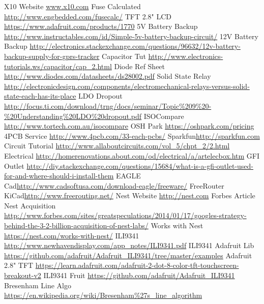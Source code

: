 \renewcommand{\refname}{}
\begin{thebibliography}{9}
 X10 Website \url{www.x10.com}
 Fuse Calculated \url{http://www.engbedded.com/fusecalc/}
 TFT 2.8" LCD \url{https://www.adafruit.com/products/1770}
 5V Battery Backup \url{http://www.instructables.com/id/Simple-5v-battery-backup-circuit/}
 12V Battery Backup \url{http://electronics.stackexchange.com/questions/96632/12v-battery-backup-supply-for-gprs-tracker}
 Capacitor Tut \url{http://www.electronics-tutorials.ws/capacitor/cap_2.html}
 Diode Ref Sheet \url{http://www.diodes.com/datasheets/ds28002.pdf}
 Solid State Relay \url{http://electronicdesign.com/components/electromechanical-relays-versus-solid-state-each-has-its-place}
 LDO Dropout \url{http://focus.ti.com/download/trng/docs/seminar/Topic\%209\%20-\%20Understanding\%20LDO\%20dropout.pdf}
 ISOCompare \url{http://www.tortech.com.au/isocompare}
 OSH Park \url{https://oshpark.com/pricing}
 4PCB Service \url{http://www.4pcb.com/33-each-pcbs/}
 Sparkfun\url{http://sparkfun.com}
 Circuit Tutorial \url{http://www.allaboutcircuits.com/vol_5/chpt_2/2.html}
 Electrical \url{http://homerenovations.about.com/od/electrical/a/artelecbox.htm}
 GFI Outlet \url{http://diy.stackexchange.com/questions/15684/what-is-a-gfi-outlet-used-for-and-where-should-i-install-them}
 EAGLE Cad\url{http://www.cadsoftusa.com/download-eagle/freeware/}
 FreeRouter KiCad\url{http://www.freerouting.net/}
 Nest Website \url{http://nest.com}
 Forbes Article Nest Acquisition \url{http://www.forbes.com/sites/greatspeculations/2014/01/17/googles-strategy-behind-the-3-2-billion-acquisition-of-nest-labs/}
 Works with Nest \url{https://nest.com/works-with-nest/}
 ILI9341 \url{http://www.newhavendisplay.com/app_notes/ILI9341.pdf}
 ILI9341 Adafruit Lib \url{https://github.com/adafruit/Adafruit_ILI9341/tree/master/examples}
 Adafruit 2.8" TFT \url{https://learn.adafruit.com/adafruit-2-dot-8-color-tft-touchscreen-breakout-v2}
 ILI9341 Fruit \url{https://github.com/adafruit/Adafruit_ILI9341}
 Bresenham Line Algo \url{https://en.wikipedia.org/wiki/Bresenham\%27s_line_algorithm}
\end{thebibliography}

